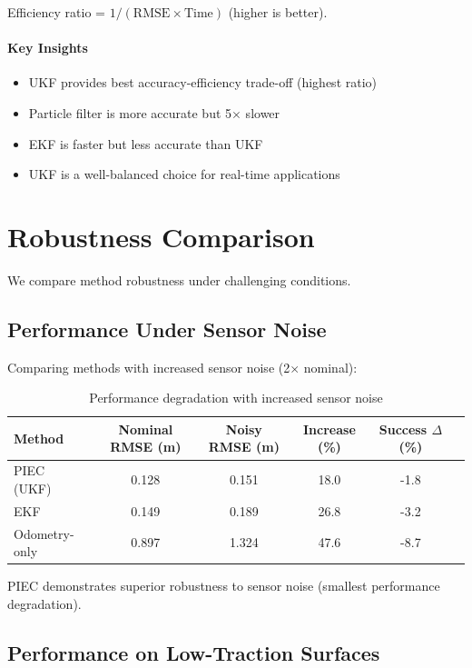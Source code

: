 Efficiency ratio = $1 / (\text{RMSE} \times \text{Time})$ (higher is better).

\paragraph{Key Insights}
\begin{itemize}
    \item UKF provides best accuracy-efficiency trade-off (highest ratio)
    \item Particle filter is more accurate but 5$\times$ slower
    \item EKF is faster but less accurate than UKF
    \item UKF is a well-balanced choice for real-time applications
\end{itemize}

\section{Robustness Comparison}
\label{sec:robustness_comparison}

We compare method robustness under challenging conditions.

\subsection{Performance Under Sensor Noise}

Comparing methods with increased sensor noise (2$\times$ nominal):

\begin{table}[htbp]
\centering
\caption{Performance degradation with increased sensor noise}
\label{tab:robustness_sensor_noise}
\begin{tabular}{lccccc}
\toprule
\textbf{Method} & \textbf{Nominal RMSE (m)} & \textbf{Noisy RMSE (m)} & \textbf{Increase (\%)} & \textbf{Success $\Delta$ (\%)} \\
\midrule
PIEC (UKF) & 0.128 & 0.151 & 18.0 & -1.8 \\
EKF & 0.149 & 0.189 & 26.8 & -3.2 \\
Odometry-only & 0.897 & 1.324 & 47.6 & -8.7 \\
\bottomrule
\end{tabular}
\end{table}

PIEC demonstrates superior robustness to sensor noise (smallest performance degradation).

\subsection{Performance on Low-Traction Surfaces}

